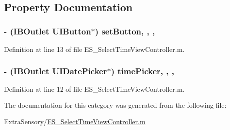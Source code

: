 \subsection{Property Documentation}
\hypertarget{category_e_s___select_time_view_controller_07_08_afcb06346b106ce1d23a3978d4fd4a22b}{
\subsubsection[{set\+Button}]{\setlength{\rightskip}{0pt plus 5cm}-\/ (I\+B\+Outlet U\+I\+Button$\ast$) set\+Button\hspace{0.3cm}{\ttfamily [read]}, {\ttfamily [write]}, {\ttfamily [nonatomic]}, {\ttfamily [weak]}}}\label{category_e_s___select_time_view_controller_07_08_afcb06346b106ce1d23a3978d4fd4a22b}


Definition at line 13 of file E\+S\+\_\+\+Select\+Time\+View\+Controller.\+m.

\hypertarget{category_e_s___select_time_view_controller_07_08_a28097058e2362170af851ef837770710}{
\subsubsection[{time\+Picker}]{\setlength{\rightskip}{0pt plus 5cm}-\/ (I\+B\+Outlet U\+I\+Date\+Picker$\ast$) time\+Picker\hspace{0.3cm}{\ttfamily [read]}, {\ttfamily [write]}, {\ttfamily [nonatomic]}, {\ttfamily [weak]}}}\label{category_e_s___select_time_view_controller_07_08_a28097058e2362170af851ef837770710}


Definition at line 12 of file E\+S\+\_\+\+Select\+Time\+View\+Controller.\+m.



The documentation for this category was generated from the following file\+:\begin{DoxyCompactItemize}
\item 
Extra\+Sensory/\hyperlink{_e_s___select_time_view_controller_8m}{E\+S\+\_\+\+Select\+Time\+View\+Controller.\+m}\end{DoxyCompactItemize}

